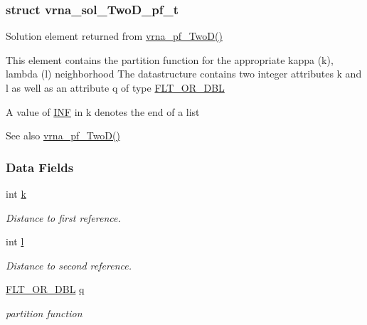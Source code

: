 \subsubsection{struct vrna\+\_\+sol\+\_\+\+Two\+D\+\_\+pf\+\_\+t}
Solution element returned from \hyperlink{group__kl__neighborhood__pf_ga0bc3427689bd09da09b8b3094a27f836}{vrna\+\_\+pf\+\_\+\+Two\+D()} 

This element contains the partition function for the appropriate kappa (k), lambda (l) neighborhood The datastructure contains two integer attributes \textquotesingle{}k\textquotesingle{} and \textquotesingle{}l\textquotesingle{} as well as an attribute \textquotesingle{}q\textquotesingle{} of type \hyperlink{group__data__structures_ga31125aeace516926bf7f251f759b6126}{F\+L\+T\+\_\+\+O\+R\+\_\+\+D\+BL}

A value of \hyperlink{energy__const_8h_a12c2040f25d8e3a7b9e1c2024c618cb6}{I\+NF} in k denotes the end of a list

\begin{DoxySeeAlso}{See also}
\hyperlink{group__kl__neighborhood__pf_ga0bc3427689bd09da09b8b3094a27f836}{vrna\+\_\+pf\+\_\+\+Two\+D()} 
\end{DoxySeeAlso}
\subsubsection*{Data Fields}
\begin{DoxyCompactItemize}
\item 
int \hyperlink{group__kl__neighborhood__pf_ad1f23b46dc4ebd373abdeb0382d87b83}{k}\hypertarget{group__kl__neighborhood__pf_ad1f23b46dc4ebd373abdeb0382d87b83}{}\label{group__kl__neighborhood__pf_ad1f23b46dc4ebd373abdeb0382d87b83}

\begin{DoxyCompactList}\small\item\em Distance to first reference. \end{DoxyCompactList}\item 
int \hyperlink{group__kl__neighborhood__pf_a01133c264eff2c988d144e07803d1b8b}{l}\hypertarget{group__kl__neighborhood__pf_a01133c264eff2c988d144e07803d1b8b}{}\label{group__kl__neighborhood__pf_a01133c264eff2c988d144e07803d1b8b}

\begin{DoxyCompactList}\small\item\em Distance to second reference. \end{DoxyCompactList}\item 
\hyperlink{group__data__structures_ga31125aeace516926bf7f251f759b6126}{F\+L\+T\+\_\+\+O\+R\+\_\+\+D\+BL} \hyperlink{group__kl__neighborhood__pf_a17ebbf425b8769ded74b5c7b85e58ee1}{q}\hypertarget{group__kl__neighborhood__pf_a17ebbf425b8769ded74b5c7b85e58ee1}{}\label{group__kl__neighborhood__pf_a17ebbf425b8769ded74b5c7b85e58ee1}

\begin{DoxyCompactList}\small\item\em partition function \end{DoxyCompactList}\end{DoxyCompactItemize}



